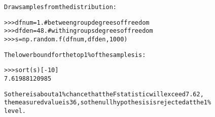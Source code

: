 \begin{boxedminipage}{\funcwidth}
\begin{alltt}
Draw samples from the distribution:

{\textgreater}{\textgreater}{\textgreater} dfnum = 1. \# between group degrees of freedom
{\textgreater}{\textgreater}{\textgreater} dfden = 48. \# within groups degrees of freedom
{\textgreater}{\textgreater}{\textgreater} s = np.random.f(dfnum, dfden, 1000)

The lower bound for the top 1\% of the samples is :

{\textgreater}{\textgreater}{\textgreater} sort(s)[-10]
7.61988120985

So there is about a 1\% chance that the F statistic will exceed 7.62,
the measured value is 36, so the null hypothesis is rejected at the 1\%
level.
\end{alltt}

\setlength{\parskip}{1ex}
    \end{boxedminipage}

    \label{trunk:qstkutil:bollinger:gamma}

    \vspace{0.5ex}

